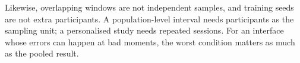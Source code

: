 \iffull
Likewise, overlapping windows are not independent samples, and training seeds are not extra participants. A population-level interval needs participants as the sampling unit; a personalised study needs repeated sessions. For an interface whose errors can happen at bad moments, the worst condition matters as much as the pooled result.

\fi